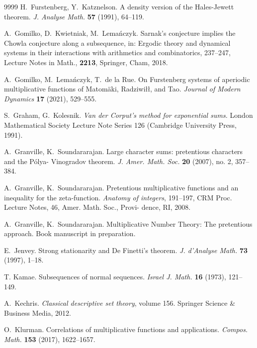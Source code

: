 \documentclass[11pt]{amsart}
\theoremstyle{definition}
\begin{document}
\begin{thebibliography}{9999}
	 H.~Furstenberg, Y.~Katznelson.
	A density version of the Hales-Jewett theorem. {\em  J. Analyse
		Math.} \textbf{57} (1991), 64--119.

A.\ Gomilko, D.\ Kwietniak, M.\ Lema\'nczyk.  Sarnak's conjecture implies the Chowla conjecture along a subsequence, in:
{Ergodic theory and dynamical systems in their interactions with arithmetics and combinatorics, 237–247, Lecture Notes in Math.}, {\bf 2213}, Springer, Cham, 2018.	
	
	 A.~Gomilko, M.~Lema\'nczyk, T.~de la Rue.
	On Furstenberg systems of aperiodic multiplicative functions of Matom\"aki, Radziwi{\l}{\l}, and Tao. {\em Journal of Modern Dynamics}  \textbf{17}   (2021), 529--555.
	
	S.~Graham, G.~Kolesnik. {\em  Van der Corput’s method for exponential sums.} London Mathematical Society Lecture Note Series 126 (Cambridge University Press, 1991).
	
	A.~Granville, K.~Soundararajan. Large character sums: pretentious characters and the P\'olya-
	Vinogradov theorem. {\em J. Amer. Math. Soc.} \textbf{20} (2007), no. 2, 357--384.
	
	
A.~Granville, K.~Soundararajan. Pretentious multiplicative functions and an inequality for the zeta-function. {\em Anatomy of integers}, 191--197, CRM Proc. Lecture Notes, 46, Amer. Math. Soc., Provi- dence, RI, 2008.
	
	 A.~Granville, K.~Soundararajan. Multiplicative Number Theory: The pretentious approach. Book 	manuscript in preparation.
	
	  E.~Jenvey. Strong stationarity and De Finetti's theorem.
	{\em  J.
		d'Analyse Math.} \textbf{73} (1997), 1--18.
	
T. Kamae. Subsequences of normal sequences. {\em Israel J. Math.} {\bf 16} (1973), 121–149.
	
		A.~Kechris. {\em Classical descriptive set theory}, volume 156. Springer Science \& Business Media, 2012.
		
		
	 O.~Klurman. Correlations of multiplicative functions and applications.  {\em Compos. Math.}  \textbf{153} (2017), 1622--1657.




\end{thebibliography}
\end{document}
